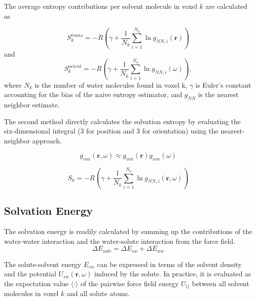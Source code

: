 \documentclass[9pt,tutorial]{livecoms}
\begin{document}
The average entropy contributions per solvent molecule in voxel $k$ are calculated as

\begin{equation}
	S_{k}^\textit{trans} = -R \left( \gamma + \frac{1}{N_\textit{k}} \sum _{i=1}^{N_k} \ln g_{NN, \textit{i}}(\textbf{r}) \right)
\end{equation}
and
\begin{equation}
	S_{k}^\textit{orient} = -R \left( \gamma + \frac{1}{N_k} \sum _{i=1}^{N_k} \ln g_{NN, i}(\omega) \right)
	,
\end{equation}
where $N_\textit{k}$ is the number of water molecules found in voxel k, $\gamma$ is Euler's constant accounting for the bias of the naive entropy estimator, and $g_\textit{NN}$ is the nearest neighbor estimate.

The second method directly calculates the solvation entropy by evaluating the six-dimensional integral (3 for position and 3 for orientation) 
using the nearest-neighbor approach. 

\begin{equation}
	g_\textit{vox} \left( \textbf{r}, \omega \right) \approx g_\textit{vox}(\textbf{r}) g_\textit{vox}(\omega)
\end{equation}

\begin{equation}
	S_\textit{k} = -R \left( \gamma + \frac{1}{N_\textit{k}} \sum _{i=1}^{N_k} \ln g_{NN, \textit{i}}(\textbf{r},\omega) \right)
\end{equation}


\subsection{Solvation Energy}
The solvation energy is readily calculated by summing up the contributions of the water-water interaction and the water-solute interaction from the force field.
\begin{equation}
	\Delta E_\textit{solv} = \Delta E_\textit{sw} + \Delta E_\textit{ww}
\end{equation}

The solute-solvent energy $E_{sw}$ can be expressed in terms of the solvent density and the potential $U_{sw}(\textbf{r},\omega)$ induced by the solute.
In practice, it is evaluated as the expectation value $\langle\cdot\rangle$ of the pairwise force field energy $U_{ij}$ between all solvent molecules in voxel $k$ and all solute atoms.
\end{document}

